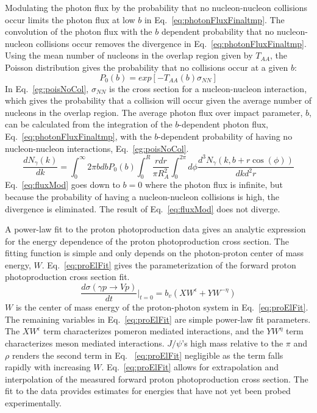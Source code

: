     Modulating the photon flux by the probability that no nucleon-nucleon 
      collisions occur limits the photon flux at low $b$ in Eq.~\ref{eq:photonFluxFinaltmp}.
    The convolution of the photon flux with the $b$ dependent probability that 
      no nucleon-nucleon collisions occur removes the divergence in 
      Eq.~\ref{eq:photonFluxFinaltmp}. 
    Using the mean number of nucleons in the overlap region given by $T_{AA}$, 
      the Poisson distribution gives the probability that no collisions 
      occur at a given $b$:
    \begin{equation} \label{eg:poisNoCol}
      P_{0}(b)=exp[-T_{AA}(b)\sigma_{NN}]
    \end{equation}
    In Eq.~\ref{eg:poisNoCol}, $\sigma_{NN}$ is the cross section for a 
      nucleon-nucleon interaction, which gives the probability that a collision
      will occur given the average number of nucleons in the overlap region.
    The average photon flux over impact parameter, $b$, can be calculated 
      from the integration of the $b$-dependent photon flux, Eq.~\ref{eq:photonFluxFinaltmp}, 
      with the $b$-dependent probability of having no nucleon-nucleon 
      interactions, Eq.~\ref{eg:poisNoCol}. 
    \begin{equation} \label{eq:fluxMod}
      \frac{dN_{\gamma}(k)}{dk}=\int_{0}^{\infty}{2\pi bdbP_{0}(b)
         \int_{0}^{R}{\frac{rdr}{\pi R^{2}_{A}}\int_{0}^{2\pi}d\phi
         \frac{d^{3}N_{\gamma}(k,b+r\cos(\phi))}{dkd^{2}r}}}
    \end{equation}
    Eq.~\ref{eq:fluxMod} goes down to $b=0$ where the photon flux is infinite, but 
      because the probability of having a nucleon-nucleon collisions is high, 
      the divergence is eliminated.
    The result of Eq.~\ref{eq:fluxMod} does not diverge.  

    A power-law fit to the proton photoproduction data gives an analytic 
      expression for the energy dependence of the proton photoproduction 
      cross section.
    The fitting function is simple and only depends on the photon-proton center
      of mass energy, $W$. 
    Eq.~\ref{eq:proElFit} gives the parameterization of the forward 
      proton photoproduction cross section fit. 
    \begin{equation} \label{eq:proElFit}
      \frac{d\sigma(\gamma p\rightarrow Vp)}{dt}\Big|_{t=0}
        =b_{v}(XW^{\epsilon}+YW^{-\eta})
    \end{equation}
    $W$ is the center of mass energy of the proton-photon system in 
      Eq.~\ref{eq:proElFit}.
    The remaining variables in Eq.~\ref{eq:proElFit} are simple power-law fit
      parameters.  
    The $XW^{\epsilon}$ term characterizes pomeron mediated interactions, and
      the $YW^{\eta}$ term characterizes meson mediated interactions\cite{vmd1999}. 
    $J/\psi$'s high mass relative to the $\pi$ and $\rho$ renders the second 
      term in Eq. ~\ref{eq:proElFit} negligible as the term falls rapidly with
      increasing $W$. 
    Eq.~\ref{eq:proElFit} allows for extrapolation and interpolation of the 
      measured forward proton photoproduction cross section. 
    The fit to the data provides estimates for energies that have not yet been 
      probed experimentally.

